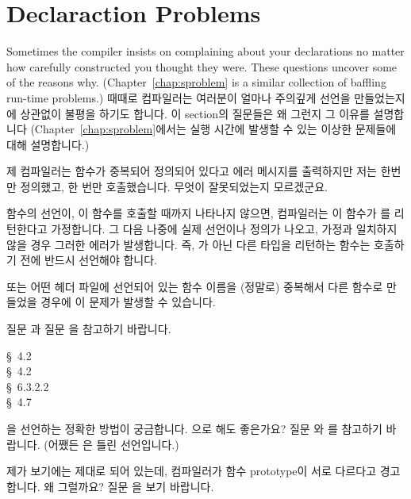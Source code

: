 \section{Declaraction Problems}	\label{sec:decproblem}
Sometimes the compiler insists on complaining about your declarations no matter
how carefully constructed you thought they were. These questions uncover some
of the reasons why. (Chapter~\ref{chap:sproblem} is a similar collection of 
baffling run-time problems.)
때때로 컴파일러는 여러분이 얼마나 주의깊게 선언을 만들었는지에 상관없이
불평을 하기도 합니다.  이 section의 질문들은 왜 그런지 그 이유를 설명합니다
(Chapter~\ref{chap:sproblem}에서는 실행 시간에 발생할 수 있는 이상한 문제들에
대해 설명합니다.)

\begin{faq}
	제 컴파일러는 함수가 중복되어 정의되어 있다고 에러 메시지를
	출력하지만 저는 한번만 정의했고, 한 번만 호출했습니다.  무엇이
	잘못되었는지 모르겠군요.

\A	함수의 선언이, 이 함수를 호출할 때까지 나타나지 않으면, 컴파일러는
	이 함수가 를 리턴한다고 가정합니다.  그 다음 나중에 실제
	선언이나 정의가 나오고, 가정과 일치하지 않을 경우 그러한 에러가
	발생합니다.  즉, 가 아닌 다른 타입을 리턴하는 함수는 호출하기
	전에 반드시 선언해야 합니다.

	또는 어떤 헤더 파일에 선언되어 있는 함수 이름을 (정말로) 중복해서 다른
	함수로 만들었을 경우에 이 문제가 발생할 수 있습니다.

	질문 과 질문 을 참고하기 바랍니다.

\R
	\cite{kr1} \S\ 4.2  \\
	\cite{kr2} \S\ 4.2  \\
	\cite{c89} \S\ 6.3.2.2 \\
	\cite{hs} \S\ 4.7 
\end{faq}

\begin{faq}
	을 선언하는 정확한 방법이 궁금합니다.
        으로 해도 좋은가요?
\A
	질문 와 를 참고하기 바랍니다.  
        (어쨌든 은 틀린 선언입니다.)
\end{faq}

\begin{faq}
        제가 보기에는 제대로 되어 있는데, 컴파일러가 함수 prototype이 서로
        다르다고 경고합니다. 왜 그럴까요?
\A
        질문 을 보기 바랍니다.
\end{faq}


